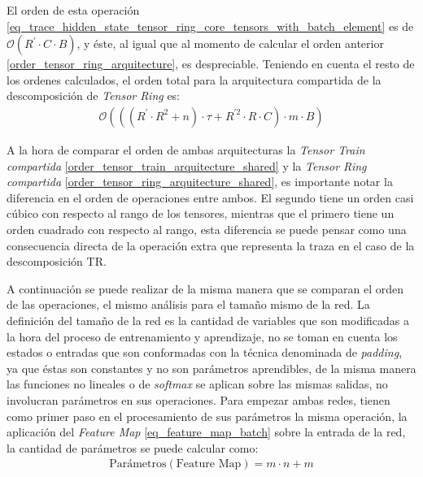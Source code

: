 \documentclass[spanish]{article}
\theoremstyle{definition}
\theoremstyle{remark}
\numberwithin{equation}{section}
\numberwithin{equation}{section} %
\begin{document}
\par 
El orden de esta operación \eqref{eq_trace_hidden_state_tensor_ring_core_tensors_with_batch_element} es de $\mathcal{O}(R^\prime  \cdot C \cdot B)$, y éste, al igual que al momento de calcular el orden anterior \eqref{order_tensor_ring_arquitecture}, es despreciable. Teniendo en cuenta el resto de los ordenes calculados, el orden total para la arquitectura compartida de la descomposición de \textit{Tensor Ring} es:
\begin{equation}
\label{order_tensor_ring_arquitecture_shared}
\begin{gathered}
\mathcal{O}(((R^\prime \cdot R^{2}+n)\cdot \tau+  R^{\prime 2} \cdot R \cdot C) \cdot m \cdot B  )
\end{gathered}
\end{equation} \par
 A la hora de comparar el orden de ambas arquitecturas la \textit{Tensor Train compartida} \eqref{order_tensor_train_arquitecture_shared} y la \textit{Tensor Ring compartida} \eqref{order_tensor_ring_arquitecture_shared}, es importante notar la diferencia en el orden de operaciones entre ambos. El segundo tiene un orden casi cúbico con respecto al rango de los tensores, mientras que el primero tiene un orden cuadrado con respecto al rango, esta diferencia se puede pensar como una consecuencia directa de la operación extra que representa la traza en el caso de la descomposición TR.
 \par
 A continuación se puede realizar de la misma manera que se comparan el orden de las operaciones, el mismo análisis para el tamaño mismo de la red. La definición del tamaño de la red es la cantidad de variables que son modificadas a la hora del proceso de entrenamiento y aprendizaje, no se toman en cuenta los estados o entradas que son conformadas con la técnica denominada de \textit{padding}, ya que éstas son constantes y no son parámetros aprendibles, de la misma manera las funciones no lineales o de \textit{softmax} se aplican sobre las mismas salidas, no involucran parámetros en sus operaciones. Para empezar ambas redes, tienen como primer paso en el procesamiento de sus parámetros la misma operación, la aplicación del \textit{Feature Map} \eqref{eq_feature_map_batch} sobre 
  la entrada de la red, la cantidad de parámetros se puede calcular como:
 \begin{equation}
\label{feature_map_parameters}
\begin{gathered}
\text{Parámetros}(\text{Feature Map})=m \cdot n + m 
\end{gathered}
\end{equation} \par
\end{document}
